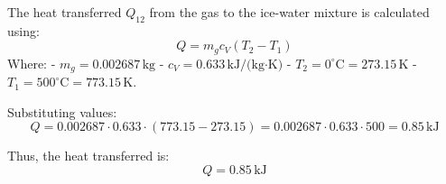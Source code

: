 The heat transferred \( Q_{12} \) from the gas to the ice-water mixture is calculated using:  
\[
Q = m_g c_V (T_2 - T_1)
\]  
Where:  
- \( m_g = 0.002687 \, \text{kg} \)  
- \( c_V = 0.633 \, \text{kJ/(kg·K)} \)  
- \( T_2 = 0^\circ\text{C} = 273.15 \, \text{K} \)  
- \( T_1 = 500^\circ\text{C} = 773.15 \, \text{K} \).  

Substituting values:  
\[
Q = 0.002687 \cdot 0.633 \cdot (773.15 - 273.15) = 0.002687 \cdot 0.633 \cdot 500 = 0.85 \, \text{kJ}
\]  

Thus, the heat transferred is:  
\[
Q = 0.85 \, \text{kJ}
\]